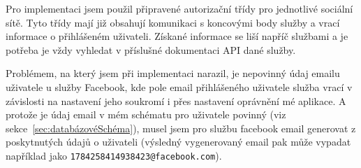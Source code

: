 Pro implementaci jsem použil připravené autorizační třídy pro jednotlivé sociální sítě.
Tyto třídy mají již obsahují komunikaci s koncovými body služby a vrací informace o přihlášeném uživateli.
Získané informace se liší napříč službami a je potřeba je vždy vyhledat v příslušné dokumentaci \gls{API} dané služby.

Problémem, na který jsem při implementaci narazil, je nepovinný údaj emailu uživatele u služby Facebook, kde pole email přihlášeného uživatele služba vrací v závislosti na nastavení jeho soukromí i přes nastavení oprávnění mé aplikace.
A protože je údaj email v mém schématu pro uživatele povinný (viz sekce~\ref{sec:databázovéSchéma}), musel jsem pro službu facebook email generovat z poskytnutých údajů o uživateli (výsledný vygenerovaný email pak může vypadat například jako \texttt{1784258414938423@facebook.com}).
